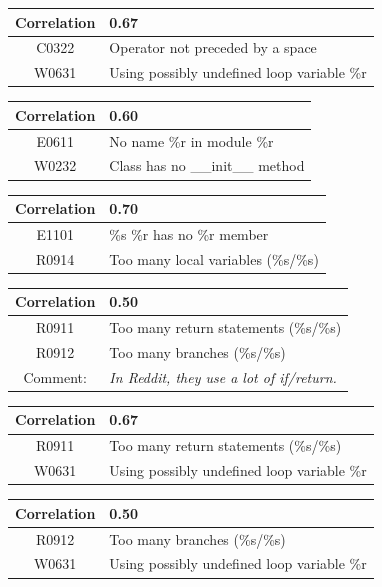 \documentclass[12pt, a4paper]{article}
\newcommand{\tbf}[1]{\textbf{#1}}
\newcommand{\noi}{\noindent}
\begin{document}
\bigskip \noi
\begin{tabularx}{\textwidth}{|c|X|}
\hline
\tbf{Correlation}		& 0.67 \\
\hline
C0322		& Operator not preceded by a space \\
\hline
W0631		& Using possibly undefined loop variable \%r \\
\hline
\end{tabularx}

\bigskip \noi
\begin{tabularx}{\textwidth}{|c|X|}
\hline
\tbf{Correlation}   & 0.60 \\
\hline
E0611   & No name \%r in module \%r \\
\hline
W0232   & Class has no \_\_init\_\_ method \\
\hline
\end{tabularx}

\bigskip \noi
\begin{tabularx}{\textwidth}{|c|X|}
\hline
\tbf{Correlation}   & 0.70 \\
\hline
E1101   & \%s \%r has no \%r member \\
\hline
R0914   & Too many local variables (\%s/\%s) \\
\hline
\end{tabularx}

\bigskip \noi
\begin{tabularx}{\textwidth}{|c|X|}
\hline
\tbf{Correlation}   & 0.50 \\
\hline
R0911   & Too many return statements (\%s/\%s) \\
\hline
R0912   & Too many branches (\%s/\%s) \\
\hline
Comment: & \textit{In Reddit, they use a lot of if/return.} \\
\hline
\end{tabularx}

\bigskip \noi
\begin{tabularx}{\textwidth}{|c|X|}
\hline
\tbf{Correlation}   & 0.67 \\
\hline
R0911   & Too many return statements (\%s/\%s) \\
\hline
W0631   & Using possibly undefined loop variable \%r \\
\hline
\end{tabularx}

\bigskip \noi
\begin{tabularx}{\textwidth}{|c|X|}
\hline
\tbf{Correlation}   & 0.50 \\
\hline
R0912   & Too many branches (\%s/\%s) \\
\hline
W0631   & Using possibly undefined loop variable \%r \\
\hline
\end{tabularx}
\end{document}
